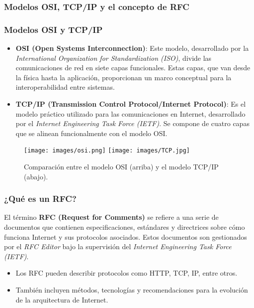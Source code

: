 \documentclass[a4paper,12pt]{article}
\begin{document}
\subsubsection{Modelos OSI, TCP/IP y el concepto de RFC}

\subsubsection*{Modelos OSI y TCP/IP}

\begin{itemize}
    \item \textbf{OSI (Open Systems Interconnection)}: 
    Este modelo, desarrollado por la \textit{International Organization for Standardization (ISO)}, divide las comunicaciones de red en siete capas funcionales. Estas capas, que van desde la física hasta la aplicación, proporcionan un marco conceptual para la interoperabilidad entre sistemas.

    \item \textbf{TCP/IP (Transmission Control Protocol/Internet Protocol)}: 
    Es el modelo práctico utilizado para las comunicaciones en Internet, desarrollado por el \textit{Internet Engineering Task Force (IETF)}. Se compone de cuatro capas que se alinean funcionalmente con el modelo OSI.
\end{itemize}

\begin{figure}[H]
    \centering
    \texttt{[image: images/osi.png]}
    \hfill
    \texttt{[image: images/TCP.jpg]}
    \caption{Comparación entre el modelo OSI (arriba) y el modelo TCP/IP (abajo).}
    \label{fig:models}
\end{figure}

\subsubsection*{¿Qué es un RFC?}

El término \textbf{RFC (Request for Comments)} se refiere a una serie de documentos que contienen especificaciones, estándares y directrices sobre cómo funciona Internet y sus protocolos asociados. Estos documentos son gestionados por el \textit{RFC Editor} bajo la supervisión del \textit{Internet Engineering Task Force (IETF)}.

\begin{itemize}
    \item Los RFC pueden describir protocolos como HTTP, TCP, IP, entre otros.
    \item También incluyen métodos, tecnologías y recomendaciones para la evolución de la arquitectura de Internet.
\end{itemize}
\end{document}
